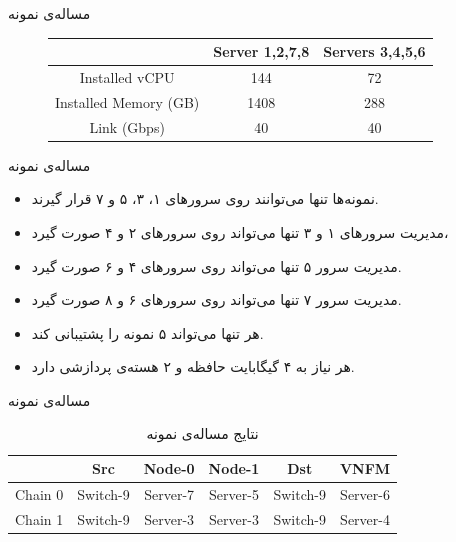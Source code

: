 \documentclass{beamer}
\makeatletter
\newcommand{\RTList}{\raggedleft\rightskip\@totalleftmargin}
\makeatother
\begin{document}
\begin{persian}
\begin{frame}{مساله‌ی نمونه}
\begin{figure}[h!]
\begin{center}
\begin{latin}
\begin{tabular}{|c|c|c|}
            \hline
            & Server 1,2,7,8 & Servers 3,4,5,6 \\
            \hline
            Installed vCPU & 144 & 72 \\
            \hline
            Installed Memory (GB) & 1408 & 288 \\
            \hline
            Link (Gbps) & 40 & 40 \\
            \hline
        \end{tabular}\end{latin}\end{center}
    \end{figure}
\end{frame}
\begin{frame}{مساله‌ی نمونه}
    \begin{itemize}\RTList{}
        \justifying
        \item نمونه‌ها تنها می‌توانند روی سرورهای ۱، ۳، ۵ و ۷ قرار گیرند.
        \item مدیریت سرورهای ۱ و ۳ تنها می‌تواند روی سرورهای ۲ و ۴  صورت گیرد،
        \item مدیریت سرور ۵ تنها می‌تواند روی سرورهای ۴ و ۶ صورت گیرد.
        \item مدیریت سرور ۷ تنها می‌تواند روی سرورهای ۶ و ۸ صورت گیرد.
        \item هر  تنها می‌تواند ۵ نمونه را پشتیبانی کند.
        \item هر  نیاز به ۴ گیگابایت حافظه و ۲ هسته‌ی پردازشی دارد.
    \end{itemize}
\end{frame}
\begin{frame}{مساله‌ی نمونه}
    \begin{table}[h!]
        \caption{نتایج مساله‌ی نمونه}
        \vspace{0.5cm}
        \begin{center}\begin{latin}\begin{tabular}{|c|c|c|c|c|c|}
            \hline
            & Src & Node-0 & Node-1 & Dst & VNFM \\
            \hline
            Chain 0 & Switch-9 & Server-7 & Server-5 & Switch-9 & Server-6 \\
            \hline
            Chain 1 & Switch-9 & Server-3 & Server-3 & Switch-9 & Server-4 \\
            \hline
        \end{tabular}\end{latin}\end{center}
    \end{table}
\end{frame}
\begin{frame}{}

\end{frame}
\end{persian}
\end{document}
